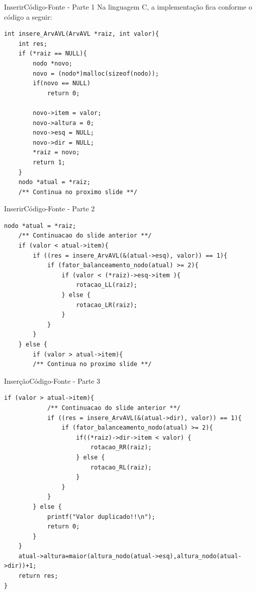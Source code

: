 \documentclass[aspectratio=169]{beamer}
\begin{document}

\begin{frame}[fragile]{Inserir}{Código-Fonte - Parte 1}
Na linguagem C, a implementação fica conforme o código a seguir:
\begin{lstlisting}[style=CStyle]
int insere_ArvAVL(ArvAVL *raiz, int valor){
    int res;
    if (*raiz == NULL){
        nodo *novo;
        novo = (nodo*)malloc(sizeof(nodo));
        if(novo == NULL)
            return 0;

        novo->item = valor;
        novo->altura = 0;
        novo->esq = NULL;
        novo->dir = NULL;
        *raiz = novo;
        return 1;
    }
    nodo *atual = *raiz;
    /** Continua no proximo slide **/   
\end{lstlisting}  
\end{frame}


\begin{frame}[fragile]{Inserir}{Código-Fonte - Parte 2}
\begin{lstlisting}[style=CStyle,firstnumber=16]
    nodo *atual = *raiz;
    /** Continuacao do slide anterior **/
    if (valor < atual->item){
        if ((res = insere_ArvAVL(&(atual->esq), valor)) == 1){
            if (fator_balanceamento_nodo(atual) >= 2){
                if (valor < (*raiz)->esq->item ){
                    rotacao_LL(raiz);
                } else {
                    rotacao_LR(raiz);
                }
            }
        }
    } else {
        if (valor > atual->item){
        /** Continua no proximo slide **/        
\end{lstlisting}  
\end{frame}


\begin{frame}[fragile]{Inserção}{Código-Fonte - Parte 3}
\begin{lstlisting}[style=CStyle,firstnumber=29]
        if (valor > atual->item){
            /** Continuacao do slide anterior **/        
            if ((res = insere_ArvAVL(&(atual->dir), valor)) == 1){
                if (fator_balanceamento_nodo(atual) >= 2){
                    if((*raiz)->dir->item < valor) {
                        rotacao_RR(raiz);
                    } else {
                        rotacao_RL(raiz);
                    }
                }
            }
        } else {
            printf("Valor duplicado!!\n");
            return 0;
        }
    }
    atual->altura=maior(altura_nodo(atual->esq),altura_nodo(atual->dir))+1;
    return res;
}
\end{lstlisting}  
\end{frame}
\end{document}
